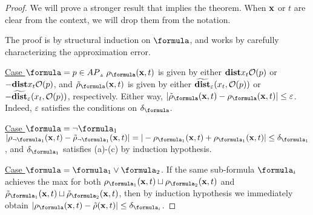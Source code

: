 \begin{proof}
	We will prove a stronger result that implies the theorem.	
	When $\mathbf{x}$ or $t$ are clear from the context, we will drop them from the notation.
	
	The proof is by structural induction on $\formula$, and works by carefully characterizing the approximation error.
	
\underline{Case $\formula = p \in AP$.}
$\robf(\sstraj,t)$ is given by either $\mathbf{dist}{x_t}{\mathcal{O}(p)}$ or $-\mathbf{dist}{x_t}{\mathcal{O}(p)}$, and 
$\srobf(\sstraj,t)$ is given by either $\widetilde{\mathbf{dist}}_\varepsilon(x_t,\mathcal{O}(p))$ or $-\widetilde{\mathbf{dist}}_\varepsilon(x_t,\mathcal{O}(p))$, respectively.
Either way, $|\srobf(\sstraj,t) - \robf(\sstraj,t)| \leq \varepsilon$.
Indeed, $\varepsilon$ satisfies the conditions on $\delta_\formula$.

\underline{Case $\formula = \neg \formula_1$} 
$|\rob_{\neg \formula_1}(\sstraj,t)-\srob_{\neg \formula_1}(\sstraj,t)| = |-\rob_{\formula_1}(\sstraj,t) + \rob_{ \formula_1}(\sstraj,t)|  \leq \delta_{\formula_1}$, and $\delta_{\formula_1}$ satisfies (a)-(c) by induction hypothesis.

\underline{Case $\formula = \formula_1 \lor \formula_2$}.
If the same sub-formula $\formula_i$ achieves the max for both $\rob_{\formula_1}(\sstraj,t) \sqcup \rob_{\formula_2}(\sstraj,t)$ and $\srob_{\formula_1}(\sstraj,t) \sqcup \srob_{\formula_2}(\sstraj,t)$, then by induction hypothesis we immediately obtain 
$|\robf(\sstraj,t)-\srob(\sstraj,t)|  \leq \delta_{\formula_i}$.


\end{proof}

